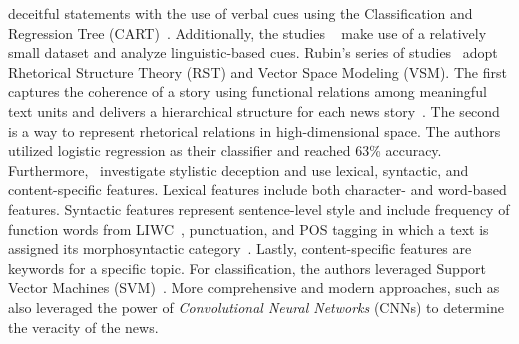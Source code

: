 \begin{description}
\begin{itemize}
deceitful statements with the use of verbal cues using the Classification and Regression Tree (CART)~\parencite{ClassificationRegressioniTrees_Breiman}. Additionally, the studies ~\parencite{OnLyingAndBeingLiedTo_Hancock, OnDeceptionAndDeceptionDetection_Rubin} make use of a relatively small dataset and analyze linguistic-based cues. Rubin’s series of  studies~\parencite{OnDeceptionAndDeceptionDetection_Rubin, IdentificationOfTruth_Rubin, TruthAndDeception_Rubin, TowardsNewsVerification_Rubin} adopt Rhetorical Structure Theory (RST) and Vector Space Modeling (VSM). The first captures the coherence of a story using functional relations among meaningful text units and delivers a hierarchical structure for each news story~\parencite{RST_William}. The second is a way to represent rhetorical relations in high-dimensional space. The authors utilized logistic regression as their classifier and reached 63\% accuracy.\\Furthermore,~\cite{DetectingHoaxesFraudsAndDeception_Afroz} investigate stylistic deception and use lexical, syntactic, and content-specific features. Lexical features include both character- and word-based features. Syntactic features represent sentence-level style and include frequency of function words from LIWC~\parencite{LIWC2007_Pennebaker}, punctuation, and POS tagging in which a text is assigned its morphosyntactic category~\parencite{POS_Daelemans}. Lastly, content-specific features are keywords for a specific topic. For classification, the authors leveraged Support Vector Machines (SVM)~\parencite{SVM_Hearst}. More comprehensive and modern approaches, such as~\cite{LiarLiarPantsOnFire_Wang} also leveraged the power of \emph{Convolutional Neural Networks} (CNNs) to determine the veracity of the news.

\end{itemize}
\end{description}
